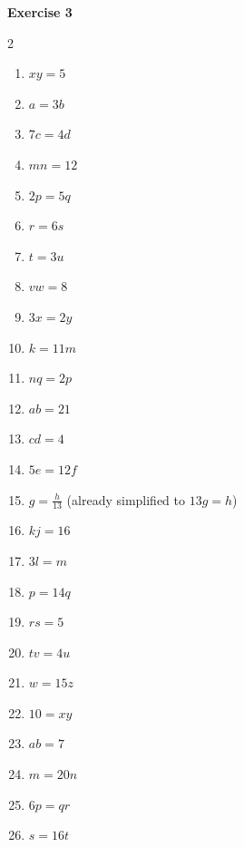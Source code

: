 \documentclass[12pt]{article}
\begin{document}
\textbf{Exercise 3}
\begin{multicols}{2}
\begin{enumerate}
\item $xy = 5$
\item $a = 3b$
\item $7c = 4d$
\item $mn = 12$
\item $2p = 5q$
\item $r = 6s$
\item $t = 3u$
\item $vw = 8$
\item $3x = 2y$
\item $k = 11m$
\item $nq = 2p$
\item $ab = 21$
\item $cd = 4$
\item $5e = 12f$
\item $g = \tfrac{h}{13}$ (already simplified to $13g = h$)
\item $kj = 16$
\item $3l = m$
\item $p = 14q$
\item $rs = 5$
\item $tv = 4u$
\item $w = 15z$
\item $10 = xy$
\item $ab = 7$
\item $m = 20n$
\item $6p = qr$
\item $s = 16t$
\end{enumerate}
\end{multicols}
\end{document}
